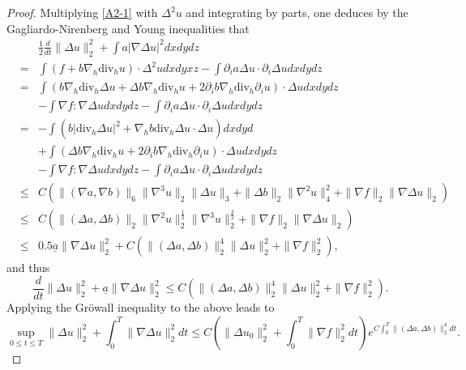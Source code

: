 \documentclass[12pt,reqno]{amsart}
\numberwithin{equation}{section}
\begin{document}
\begin{proof}
  Multiplying \eqref{A2-1} with $\Delta^2u$ and integrating by parts, one deduces by the Gagliardo-Nirenberg and Young inequalities that
  \begin{eqnarray*}
    &&\frac12\frac{d}{dt}\|\Delta u\|_2^2+\int a|\nabla\Delta u|^2dxdydz\\
    &=&\int(f+b\nabla_h\text{div}_hu)\cdot\Delta^2udxdyxz-\int\partial_ia\Delta u\cdot\partial_i\Delta udxdydz\\
    &=&\int(b\nabla_h\text{div}_h\Delta u+\Delta b\nabla_h\text{div}_hu+2\partial_ib\nabla_h\text{div}_h\partial_i u)\cdot\Delta udxdydz\\
    &&-\int\nabla f:\nabla\Delta udxdydz-\int\partial_ia\Delta u\cdot\partial_i\Delta udxdydz\\
    &=&-\int (b|\text{div}_h\Delta u|^2+\nabla_hb\text{div}_h\Delta u\cdot\Delta u)dxdyd\\
    &&+\int(\Delta b\nabla_h\text{div}_hu+2\partial_ib\nabla_h\text{div}_h\partial_i u)\cdot\Delta udxdydz\\
    &&-\int\nabla f:\nabla\Delta udxdydz-\int\partial_ia\Delta u\cdot\partial_i\Delta udxdydz\\
    &\leq&C(\|(\nabla a,\nabla b)\|_6\|\nabla^3u\|_2\|\Delta u\|_3+\|\Delta b\|_2\|\nabla^2u\|_4^2+\|\nabla f\|_2\|\nabla\Delta u\|_2)\\
    &\leq&C\left(\|(\Delta a, \Delta b)\|_2\|\nabla^2u\|_2^\frac12\|\nabla^3u\|_2^\frac32+\|\nabla f\|_2\|\nabla\Delta u\|_2\right)\\
    &\leq&0.5\underline a\|\nabla\Delta u\|_2^2+C(\|(\Delta a,\Delta b)\|_2^4\|\Delta u\|_2^2+\|\nabla f\|_2^2) ,
  \end{eqnarray*}
  and thus
  \begin{equation*}
    \frac{d}{dt}\|\Delta u\|_2^2+\underline a\|\nabla\Delta u\|_2^2
    \leq C(\|(\Delta a,\Delta b)\|_2^4\|\Delta u\|_2^2+\|\nabla f\|_2^2).
  \end{equation*}
  Applying the Gr\"owall inequality to the above leads to
  \begin{equation}
  \label{EST2U}
        \sup_{0\leq t\leq T}\|\Delta u\|_2^2+\int_0^T\|\nabla\Delta u\|_2^2dt
        \leq C\left(\|\Delta u_0\|_2^2+\int_0^T\|\nabla f\|_2^2dt\right)e^{C \int_0^T\|(\Delta a,\Delta b)\|_2^4dt }.
  \end{equation}


\end{proof}
\end{document}
